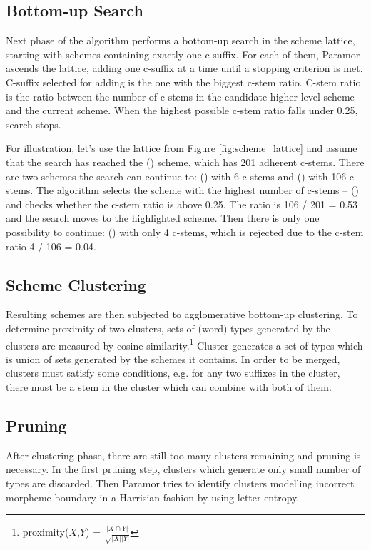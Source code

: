 \subsection{Bottom-up Search}

Next phase of the algorithm performs a bottom-up search in the scheme lattice, starting with schemes containing exactly one c-suffix. For each of them, Paramor ascends the lattice, adding one c-suffix at a time until a stopping criterion is met. C-suffix selected for adding is the one with the biggest c-stem ratio. C-stem ratio is the ratio between the number of c-stems in the candidate higher-level scheme and the current scheme. When the highest possible c-stem ratio falls under 0.25, search stops. 

For illustration, let's use the lattice from Figure \ref{fig:scheme_lattice} and assume that the search has reached the () scheme, which has 201 adherent c-stems. There are two schemes the search can continue to: () with 6 c-stems and () with 106 c-stems. The algorithm selects the scheme with the highest number of c-stems -- () and checks whether the c-stem ratio is above 0.25. The ratio is 106 / 201 = 0.53 and the search moves to the highlighted scheme. Then there is only one possibility to continue: () with only 4 c-stems, which is rejected due to the c-stem ratio 4 / 106 = 0.04.

\subsection{Scheme Clustering}

Resulting schemes are then subjected to agglomerative bottom-up clustering. To determine proximity of two clusters, sets of (word) types generated by the clusters are measured by cosine similarity.\footnote{proximity($X$,$Y$) = $\frac{|X \cap Y|}{\sqrt{|X||Y|}}$} Cluster generates a set of types which is union of sets generated by the schemes it contains. In order to be merged, clusters must satisfy some conditions, e.g. for any two suffixes in the cluster, there must be a stem in the cluster which can combine with both of them.

\subsection{Pruning}

After clustering phase, there are still too many clusters remaining and pruning is necessary. In the first pruning step, clusters which generate only small number of types are discarded. Then Paramor tries to identify clusters modelling incorrect morpheme boundary in a Harrisian fashion by using letter entropy.


